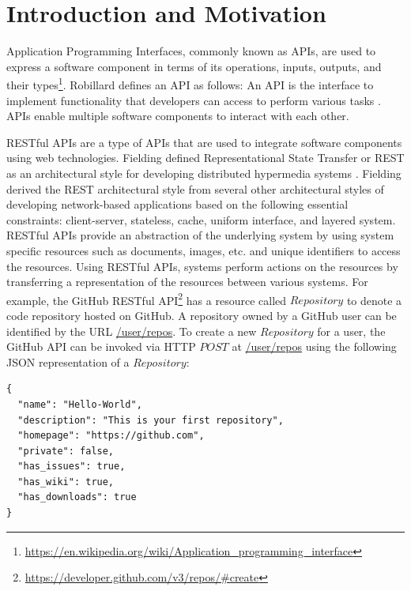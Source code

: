 \documentclass[11pt,oneside]{book}
\begin{document}
\mainmatter


\chapter{Introduction and Motivation}

Application Programming Interfaces, commonly known as APIs, are used to express a software component in terms of its operations, inputs, outputs, and their types\footnote{\url{https://en.wikipedia.org/wiki/Application_programming_interface}}. Robillard defines an API as follows: An API is the interface to implement functionality that developers can access to perform various tasks \cite{Robillard_a_field_study} \cite{Robillard_what_makes}. APIs enable multiple software components to interact with each other.

RESTful APIs are a type of APIs that are used to integrate software components using web technologies. Fielding defined Representational State Transfer or REST as an architectural style for developing distributed hypermedia systems \cite{Fielding_rest}. Fielding derived the REST architectural style from several other architectural styles of developing network-based applications based on the following essential constraints: client-server, stateless, cache, uniform interface, and layered system. RESTful APIs provide an abstraction of the underlying system by using system specific resources such as documents, images, etc. and unique identifiers to access the resources. Using RESTful APIs, systems perform actions on the resources by transferring a representation of the resources between various systems. For example, the GitHub RESTful API\footnote{\url{https://developer.github.com/v3/repos/#create}} has a resource called $Repository$ to denote a code repository hosted on GitHub. A repository owned by a GitHub user can be identified by the URL \url{/user/repos}. To create a new $Repository$ for a user, the GitHub API can be invoked via HTTP $POST$ at \url{/user/repos} using the following JSON representation of a $Repository$:

\newpage

\begin{verbatim}
{
  "name": "Hello-World",
  "description": "This is your first repository",
  "homepage": "https://github.com",
  "private": false,
  "has_issues": true,
  "has_wiki": true,
  "has_downloads": true
}
\end{verbatim}
\end{document}
